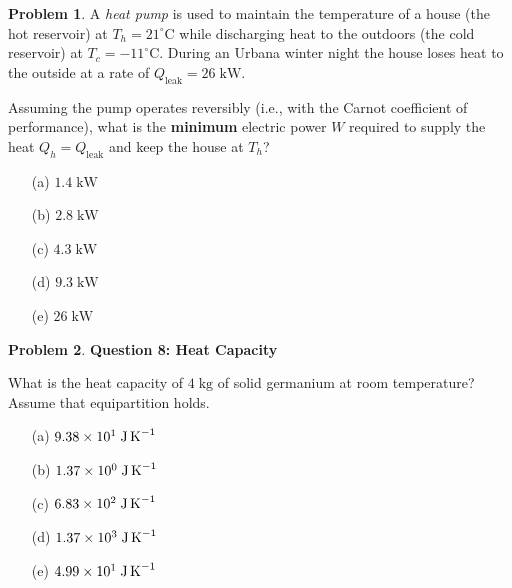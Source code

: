 \documentclass[10pt]{article}
\theoremstyle{definition} %
\newtheorem{problem}{Problem}
\theoremstyle{plain} %
\begin{document}
                      \begin{problem}
                        A \emph{heat pump} is used to maintain the temperature of a house (the hot
                        reservoir) at \(T_{h}=21^{\circ}\mathrm{C}\) while discharging heat to the
                        outdoors (the cold reservoir) at \(T_{c}=-11^{\circ}\mathrm{C}\).
                        During an Urbana winter night the house loses heat to the outside at a
                        rate of \(Q_{\text{leak}} = 26\;\text{kW}\).
                        
                        Assuming the pump operates reversibly (i.e., with the Carnot coefficient
                        of performance), what is the \textbf{minimum} electric power \(W\)
                        required to supply the heat \(Q_{h}=Q_{\text{leak}}\) and keep the house
                        at \(T_{h}\)?
                        
                        \begin{enumerate}
                          \item[(a)] \(1.4\;\text{kW}\)
                          \item[(b)] \(2.8\;\text{kW}\)  %
                          \item[(c)] \(4.3\;\text{kW}\)
                          \item[(d)] \(9.3\;\text{kW}\)
                          \item[(e)] \(26\;\text{kW}\)
                        \end{enumerate}
                        \end{problem}
                        \begin{problem}
                          \textbf{Question 8: Heat Capacity}
                          
                          What is the heat capacity of \(4\;\text{kg}\) of solid germanium at room
                          temperature?  Assume that equipartition holds.
                          
                          \begin{enumerate}
                            \item[(a)] \(9.38\times10^{1}\;\text{J\,K}^{-1}\)
                            \item[(b)] \(1.37\times10^{0}\;\text{J\,K}^{-1}\)
                            \item[(c)] \(6.83\times10^{2}\;\text{J\,K}^{-1}\)
                            \item[(d)] \(1.37\times10^{3}\;\text{J\,K}^{-1}\)
                            \item[(e)] \(4.99\times10^{1}\;\text{J\,K}^{-1}\)
                          \end{enumerate}
                          \end{problem}
\end{document}
